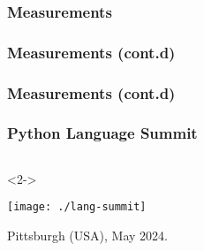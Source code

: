 \documentclass[aspectratio=169]{beamer}
\begin{document}
\begin{frame}
    \frametitle{Measurements}

    \scalebox{0.4}{}
    \scalebox{0.4}{}
\end{frame}

\begin{frame}
    \frametitle{Measurements (cont.d)}

    \centering\scalebox{0.4}{}
\end{frame}

\begin{frame}
    \frametitle{Measurements (cont.d)}

    \scalebox{0.4}{}
    \scalebox{0.4}{}
\end{frame}

\begin{frame}
    \frametitle{Python Language Summit}
    \begin{columns}
        \begin{column}{\textwidth}<2->
            \begin{center}
                \texttt{[image: ./lang-summit]}

                Pittsburgh (USA), May 2024.
            \end{center}
        \end{column}
    \end{columns}
\end{frame}
\end{document}
